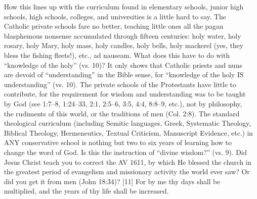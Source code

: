 {How this lines up with the curriculum found in elementary schools, junior high schools, high schools, colleges, and universities is  a little hard to say. The Catholic private schools fare no better, teaching little ones all the pagan blasphemous nonsense accumulated through fifteen centuries: holy water, holy rosary, holy Mary, holy mass, holy candles, holy bells, holy mackerel (yes, they bless the fishing fleets!), etc., ad nauseam. What does this have to do with “knowledge of the holy” (vs. 10)? It only shows that Catholic priests and nuns are devoid of “understanding” in the Bible sense, for “knowledge of the holy IS understanding” (vs. 10). The private schools of the Protestants have little to contribute, for the requirement for wisdom and understanding was to be taught by God (see 1:7–8, 1:24–33, 2:1, 2:5–6, 3:5, 4:4, 8:8–9, etc.), not by philosophy, the rudiments of this world, or the traditions of men (Col. 2:8). The standard theological curriculum (including Semitic languages, Greek, Systematic Theology, Biblical Theology, Hermeneutics, Textual Criticism, Manuscript Evidence, etc.) in ANY conservative school is nothing but two to six years of learning how to change the word of God. Is this the instruction of “divine wisdom?” (vs. 9). Did Jesus Christ teach you to correct the AV 1611, by which He blessed the church in the greatest period of evangelism and missionary activity the world ever saw? Or did you get it from men (John 18:34)?  \cite{Ruckman1972Proverbs}  }
[11] \textcolor[rgb]{0.00,0.00,1.00}{For by me thy days shall be multiplied, and the years of thy life shall be increased.}
